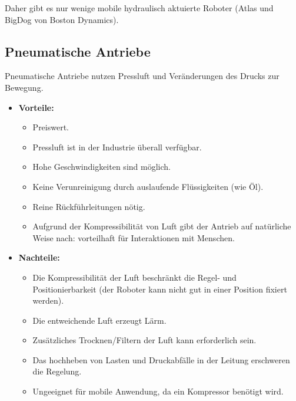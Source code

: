 			Daher gibt es nur wenige mobile hydraulisch aktuierte Roboter (\zB Atlas und BigDog von Boston Dynamics).

		\subsection{Pneumatische Antriebe}
			Pneumatische Antriebe nutzen Pressluft und Veränderungen des Drucks zur Bewegung.
			
			\begin{itemize}
				\item \textbf{Vorteile:}
					\begin{itemize}
						\item Preiswert.
						\item Pressluft ist in der Industrie überall verfügbar.
						\item Hohe Geschwindigkeiten sind möglich.
						\item Keine Verunreinigung durch auslaufende Flüssigkeiten (wie Öl).
						\item Reine Rückführleitungen nötig.
						\item Aufgrund der Kompressibilität von Luft gibt der Antrieb auf natürliche Weise nach: vorteilhaft für Interaktionen mit Menschen.
					\end{itemize}
				\item \textbf{Nachteile:}
					\begin{itemize}
						\item Die Kompressibilität der Luft beschränkt die Regel- und Positionierbarkeit (der Roboter kann nicht gut in einer Position fixiert werden).
						\item Die entweichende Luft erzeugt Lärm.
						\item Zusätzliches Trocknen/Filtern der Luft kann erforderlich sein.
						\item Das hochheben von Lasten und Druckabfälle in der Leitung erschweren die Regelung.
						\item Ungeeignet für mobile Anwendung, da ein Kompressor benötigt wird.
					\end{itemize}
			\end{itemize}

